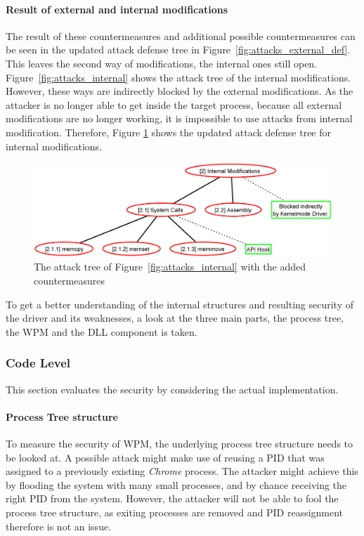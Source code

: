 \paragraph{Result of external and internal modifications}
The result of these countermeasures and additional possible countermeasures can be seen in the updated attack defense tree in Figure~\ref{fig:attacks_external_def}. This leaves the second way of modifications, the internal ones still open. Figure~\ref{fig:attacks_internal} shows the attack tree of the internal modifications. However, these ways are indirectly blocked by the external modifications. As the attacker is no longer able to get inside the target process, because all external modifications are no longer working, it is impossible to use attacks from internal modification. Therefore, Figure \ref{fig:attacks_internal_def} shows the updated attack defense tree for internal modifications.
\begin{figure}[h]
\centering
\includegraphics[scale=0.25]{sections/adtrees/InternalModifications.png}
\caption{The attack tree of Figure~\ref{fig:attacks_internal} with the added countermeasures}
\label{fig:attacks_internal_def}
\end{figure}
To get a better understanding of the internal structures and resulting security of the driver and its weaknesses, a look at the three main parts, the process tree, the \gls{WPM} and the \gls{DLL} component is taken.

\subsubsection{Code Level}
This section evaluates the security by considering the actual implementation.
\paragraph{Process Tree structure}
To measure the security of \gls{WPM}, the underlying process tree structure needs to be looked at. A possible attack might make use of reusing a \gls{PID} that was assigned to a previously existing \emph{Chrome} process. The attacker might achieve this by flooding the system with many small processes, and by chance receiving the right \gls{PID} from the system. However, the attacker will not be able to fool the process tree structure, as exiting processes are removed and \gls{PID} reassignment therefore is not an issue. 

